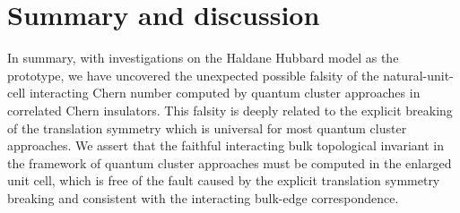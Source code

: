 \documentclass[12pt]{iopart}
\begin{document}
\section{Summary and discussion}\label{SD}

\par In summary, with investigations on the Haldane Hubbard model as the prototype, we have uncovered the unexpected possible falsity of the natural-unit-cell interacting Chern number computed by quantum cluster approaches in correlated Chern insulators. This falsity is deeply related to the explicit breaking of the translation symmetry which is universal for most quantum cluster approaches. We assert that the faithful interacting bulk topological invariant in the framework of quantum cluster approaches must be computed in the enlarged unit cell, which is free of the fault caused by the explicit translation symmetry breaking and consistent with the interacting bulk-edge correspondence.
\end{document}
